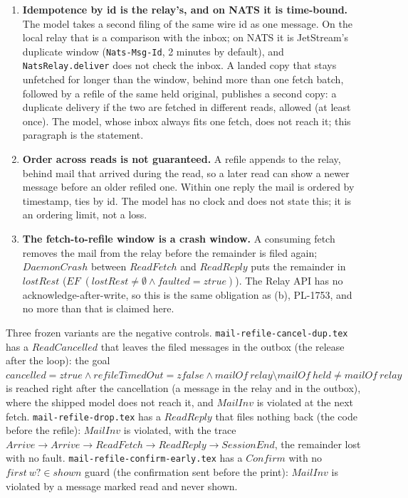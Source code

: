 \documentclass[a4paper,10pt,fleqn]{article}
\begin{document}
\begin{enumerate}
    overcounts by at most $moreSlack$, the number of held messages whose filed
    copy is already in the relay (the timed-out-but-landed refiles outstanding
    at that reply).  Where $moreSlack = 0$ the count is exact.  The overcount is
    reachable ($EF\;(moreOut > moreTruth)$) and the bound is checked over the
    whole state space.  The next read reconciles it: the copy's id is derived
    from the original's, so the fetched copy is the same message, $ReadFetch$
    replaces the held original with it, and the next reply counts it once.
  \item \textbf{Idempotence by id is the relay's, and on NATS it is time-bound.}
    The model takes a second filing of the same wire id as one message.  On the
    local relay that is a comparison with the inbox; on NATS it is JetStream's
    duplicate window (\texttt{Nats-Msg-Id}, 2 minutes by default), and
    \texttt{NatsRelay.deliver} does not check the inbox.  A landed copy that
    stays unfetched for longer than the window, behind more than one fetch batch,
    followed by a refile of the same held original, publishes a second copy: a
    duplicate delivery if the two are fetched in different reads, allowed
    (at least once).  The model, whose inbox always fits one fetch, does not reach
    it; this paragraph is the statement.
  \item \textbf{Order across reads is not guaranteed.}  A refile appends to
    the relay, behind mail that arrived during the read, so a later read can
    show a newer message before an older refiled one.  Within one reply the mail
    is ordered by timestamp, ties by id.  The model has no clock and does not
    state this; it is an ordering limit, not a loss.
  \item \textbf{The fetch-to-refile window is a crash window.}  A consuming
    fetch removes the mail from the relay before the remainder is filed
    again; $DaemonCrash$ between $ReadFetch$ and $ReadReply$ puts the
    remainder in $lostRest$ ($EF\;(lostRest \neq \emptyset \land faulted =
    ztrue)$).  The Relay API has no acknowledge-after-write, so this is the
    same obligation as (b), PL-1753, and no more than that is claimed here.
\end{enumerate}

Three frozen variants are the negative controls.
\texttt{mail-refile-cancel-dup.tex} has a $ReadCancelled$ that leaves the
filed messages in the outbox (the release after the loop): the goal $cancelled
= ztrue \land refileTimedOut = zfalse \land mailOf~relay \setminus mailOf~held
\neq mailOf~relay$ is reached right after the cancellation (a message in the
relay and in the outbox), where the shipped model does not reach it, and
$MailInv$ is violated at the next fetch.
\texttt{mail-refile-drop.tex} has a $ReadReply$ that files nothing back
(the code before the refile): $MailInv$ is violated, with the trace $Arrive
\to Arrive \to ReadFetch \to ReadReply \to SessionEnd$, the remainder lost
with no fault.  \texttt{mail-refile-confirm-early.tex} has a $Confirm$ with no
$first~w? \in shown$ guard (the confirmation sent before the print):
$MailInv$ is violated by a message marked read and never shown.
\end{document}

